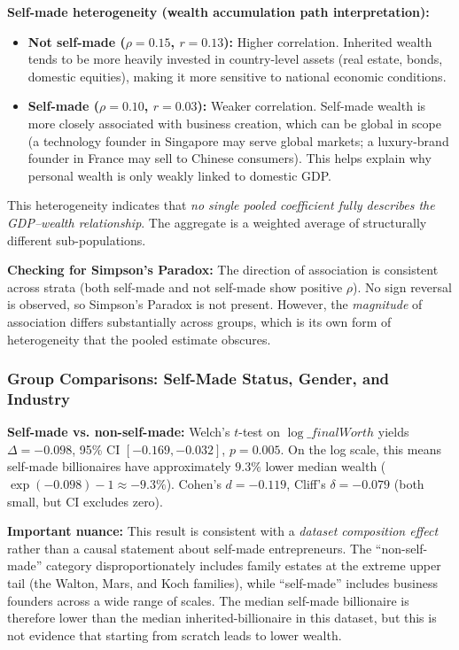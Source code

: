 \documentclass[a4paper,10pt]{article}
\begin{document}
\textbf{Self-made heterogeneity (wealth accumulation path interpretation):}
\begin{itemize}
  \item \textbf{Not self-made ($\rho = 0.15$, $r = 0.13$):} Higher correlation. Inherited wealth tends to be more heavily invested in country-level assets (real estate, bonds, domestic equities), making it more sensitive to national economic conditions.
  \item \textbf{Self-made ($\rho = 0.10$, $r = 0.03$):} Weaker correlation. Self-made wealth is more closely associated with business creation, which can be global in scope (a technology founder in Singapore may serve global markets; a luxury-brand founder in France may sell to Chinese consumers). This helps explain why personal wealth is only weakly linked to domestic GDP.
\end{itemize}

This heterogeneity indicates that \emph{no single pooled coefficient fully describes the GDP--wealth relationship}. The aggregate is a weighted average of structurally different sub-populations.

\bigskip

\textbf{Checking for Simpson's Paradox:} The direction of association is consistent across strata (both self-made and not self-made show positive $\rho$). No sign reversal is observed, so Simpson's Paradox is not present. However, the \emph{magnitude} of association differs substantially across groups, which is its own form of heterogeneity that the pooled estimate obscures.

\bigskip

\subsubsection{Group Comparisons: Self-Made Status, Gender, and Industry}
\textbf{Self-made vs. non-self-made:} Welch's $t$-test on $\log\_finalWorth$ yields $\Delta = -0.098$, 95\% CI $[-0.169, -0.032]$, $p = 0.005$.
On the log scale, this means self-made billionaires have approximately $9.3\%$ lower median wealth ($\exp(-0.098)-1 \approx -9.3\%$).
Cohen's $d = -0.119$, Cliff's $\delta = -0.079$ (both small, but CI excludes zero).

\textbf{Important nuance:} This result is consistent with a \emph{dataset composition effect} rather than a causal statement about self-made entrepreneurs. The ``non-self-made'' category disproportionately includes family estates at the extreme upper tail (the Walton, Mars, and Koch families), while ``self-made'' includes business founders across a wide range of scales. The median self-made billionaire is therefore lower than the median inherited-billionaire in this dataset, but this is not evidence that starting from scratch leads to lower wealth.
\end{document}
